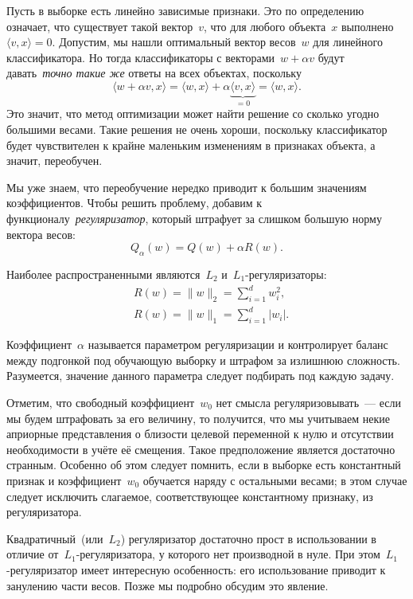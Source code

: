 \documentclass[12pt,fleqn]{article}
\begin{document}
Пусть в выборке есть линейно зависимые признаки.
Это по определению означает, что существует такой вектор~$v$,
что для любого объекта~$x$ выполнено~$\langle v, x \rangle = 0$.
Допустим, мы нашли оптимальный вектор весов~$w$ для линейного классификатора.
Но тогда классификаторы с векторами~$w + \alpha v$ будут давать~\emph{точно такие же}
ответы на всех объектах, поскольку
\[
    \langle w + \alpha v, x \rangle
    =
    \langle w, x \rangle
    +
    \alpha
    \underbrace{
        \langle v, x \rangle
    }_{=0}
    =
    \langle w, x \rangle.
\]
Это значит, что метод оптимизации может найти решение
со сколько угодно большими весами.
Такие решения не очень хороши, поскольку классификатор
будет чувствителен к крайне маленьким изменениям
в признаках объекта, а значит, переобучен.

Мы уже знаем, что переобучение нередко приводит к большим значениям коэффициентов.
Чтобы решить проблему, добавим к функционалу~\emph{регуляризатор},
который штрафует за слишком большую норму вектора весов:
\[
    Q_\alpha(w) = Q(w) + \alpha R(w).
\]

Наиболее распространенными являются~$L_2$ и~$L_1$-регуляризаторы:
\begin{align*}
    &R(w) = \|w\|_2 = \sum_{i = 1}^d w_i^2, \\
    &R(w) = \|w\|_1 = \sum_{i = 1}^d |w_i|.
\end{align*}

Коэффициент~$\alpha$ называется параметром регуляризации и контролирует баланс между
подгонкой под обучающую выборку и штрафом за излишнюю сложность.
Разумеется, значение данного параметра следует подбирать под каждую задачу.

Отметим, что свободный коэффициент~$w_0$ нет смысла регуляризовывать~---
если мы будем штрафовать за его величину, то получится, что
мы учитываем некие априорные представления о близости целевой переменной к нулю
и отсутствии необходимости в учёте её смещения.
Такое предположение является достаточно странным.
Особенно об этом следует помнить, если в выборке есть константный признак
и коэффициент~$w_0$ обучается наряду с остальными весами;
в этом случае следует исключить слагаемое, соответствующее константному признаку, из регуляризатора.

Квадратичный~(или~$L_2$) регуляризатор достаточно прост в использовании
в отличие от~$L_1$-регуляризатора, у которого нет производной в нуле.
При этом~$L_1$-регуляризатор имеет интересную особенность:
его использование приводит к занулению части весов.
Позже мы подробно обсудим это явление.
\end{document}
